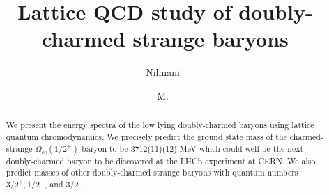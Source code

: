 \documentclass[showkeys,aps,twocolumn,showpacs,preprintnumbers,amsmath,amssymb,prl,letterpaper,floatfix,nofootinbib,superscriptaddress,]{revtex4-1}
\begin{document}
\title{Lattice QCD study of doubly-charmed strange baryons}
\author{Nilmani\ }

\author{M.\ }


\begin{abstract}
  We present the energy spectra of the low lying doubly-charmed baryons using lattice quantum chromodynamics.  We precisely predict the ground state mass of the charmed-strange $\Omega_{cc} (1/2^{+})$ baryon to be 3712(11)(12) MeV which could well be the next doubly-charmed baryon to be discovered at the LHCb experiment at CERN. We also predict masses of other doubly-charmed strange baryons with quantum numbers $3/2^{+}, 1/2^{-}$, and $3/2^{-}$. 
\end{abstract}

\maketitle
\end{document}
